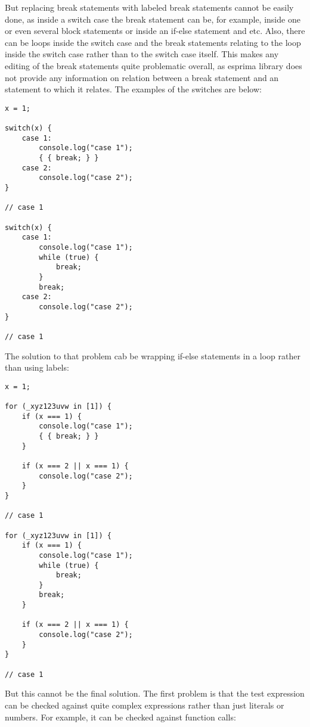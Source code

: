 \documentclass[a4paper]{article}
\begin{document}
But replacing break statements with labeled break statements cannot be easily done, as inside a switch case the break statement can be, for example, inside one or even several block statements or inside an if-else statement and etc. Also, there can be loops inside the switch case and the break statements relating to the loop inside the switch case rather than to the switch case itself. This makes any editing of the break statements quite problematic overall, as esprima library does not provide any information on relation between a break statement and an statement to which it relates. The examples of the switches are below:

\begin{lstlisting}
x = 1;

switch(x) {
    case 1: 
        console.log("case 1");
        { { break; } }
    case 2:
        console.log("case 2");	
}

// case 1

switch(x) {
    case 1: 
        console.log("case 1");
        while (true) {
            break;
        }
        break;
    case 2:
        console.log("case 2");	
}

// case 1

\end{lstlisting}

The solution to that problem cab be wrapping if-else statements in a loop rather than using labels:

\begin{lstlisting}
x = 1;

for (_xyz123uvw in [1]) {
    if (x === 1) { 
        console.log("case 1");
        { { break; } }
    }
	
    if (x === 2 || x === 1) {
        console.log("case 2");
    }	
}

// case 1

for (_xyz123uvw in [1]) {
    if (x === 1) { 
        console.log("case 1");
        while (true) {
            break;
        }    
        break;
    }
	
    if (x === 2 || x === 1) {
        console.log("case 2");
    }	
}

// case 1

\end{lstlisting}

But this cannot be the final solution. The first problem is that the test expression can be checked against quite complex expressions rather than just literals or numbers. For example, it can be checked against function calls:
\end{document}
